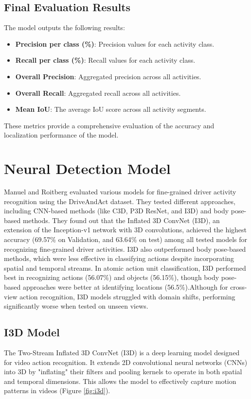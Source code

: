 \documentclass{article}
\begin{document}
\subsection{Final Evaluation Results}

The model outputs the following results:

\begin{itemize}
    \item \textbf{Precision per class (\%)}: Precision values for each activity class.
    \item \textbf{Recall per class (\%)}: Recall values for each activity class.
    \item \textbf{Overall Precision}: Aggregated precision across all activities.
    \item \textbf{Overall Recall}: Aggregated recall across all activities.
    \item \textbf{Mean IoU}: The average IoU score across all activity segments.
\end{itemize}

These metrics provide a comprehensive evaluation of the accuracy and localization performance of the model.

\section{Neural Detection Model}
Manuel and Roitberg \cite{drive_and_act_2019_iccv} evaluated various models for fine-grained driver activity recognition using the DriveAndAct dataset. They tested different approaches, including CNN-based methods (like C3D, P3D ResNet, and I3D) and body pose-based methods. They found out that the Inflated 3D ConvNet (I3D), an extension of the Inception-v1 network with 3D convolutions, achieved the highest accuracy (69.57\% on Validation, and 63.64\% on test) among all tested models for recognizing fine-grained driver activities.
I3D also outperformed body pose-based methods, which were less effective in classifying actions despite incorporating spatial and temporal streams.
In atomic action unit classification, I3D performed best in recognizing actions (56.07\%) and objects (56.15\%), though body pose-based approaches were better at identifying locations (56.5\%).Although for cross-view action recognition, I3D models struggled with domain shifts, performing significantly worse when tested on unseen views.
\subsection{I3D Model}
The Two-Stream Inflated 3D ConvNet (I3D) \cite{carreira2018quovadisactionrecognition} is a deep learning model designed for video action recognition. It extends 2D convolutional neural networks (CNNs) into 3D by "inflating" their filters and pooling kernels to operate in both spatial and temporal dimensions. This allows the model to effectively capture motion patterns in videos (Figure \ref{fig:i3d}).
\end{document}
